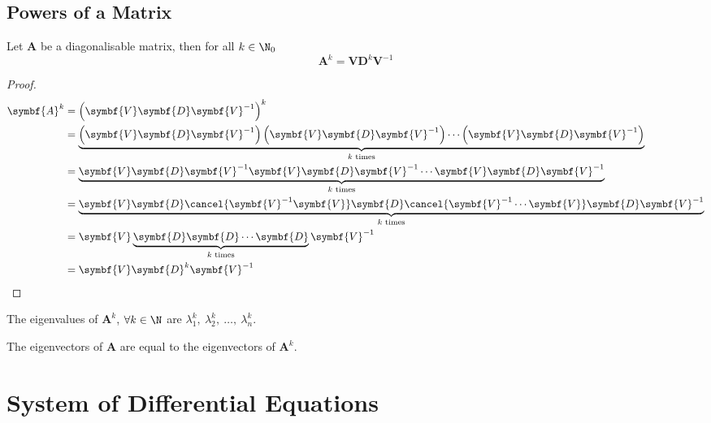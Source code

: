 \documentclass{article}
\begin{document}
\subsection{Powers of a Matrix}
\begin{theorem}
    Let \(\symbf{A}\) be a diagonalisable matrix, then for all
    \(k \in \N_0\)
    \begin{equation*}
        \symbf{A}^k = \symbf{V} \symbf{D}^k \symbf{V}^{-1}
    \end{equation*}
\end{theorem}
\begin{proof}
    \begin{align*}
        \symbf{A}^k & = \left( \symbf{V} \symbf{D} \symbf{V}^{-1} \right)^k                                                                                                                                         \\
                    & = \underbrace{\left( \symbf{V} \symbf{D} \symbf{V}^{-1} \right)\left( \symbf{V} \symbf{D} \symbf{V}^{-1} \right)\cdots\left( \symbf{V} \symbf{D} \symbf{V}^{-1} \right)}_{\text{\(k\) times}} \\
                    & = \underbrace{\symbf{V} \symbf{D} \symbf{V}^{-1} \symbf{V} \symbf{D} \symbf{V}^{-1} \cdots \symbf{V} \symbf{D} \symbf{V}^{-1} }_{\text{\(k\) times}}                                          \\
                    & = \underbrace{\symbf{V} \symbf{D} \cancel{\symbf{V}^{-1} \symbf{V}} \symbf{D} \cancel{\symbf{V}^{-1} \cdots \symbf{V}} \symbf{D} \symbf{V}^{-1} }_{\text{\(k\) times}}                        \\
                    & = \symbf{V} \underbrace{ \symbf{D} \symbf{D} \cdots \symbf{D} }_{\text{\(k\) times}}\symbf{V}^{-1}                                                                                            \\
                    & = \symbf{V} \symbf{D}^k\symbf{V}^{-1}
    \end{align*}
\end{proof}
\begin{theorem}
    The eigenvalues of \(\symbf{A}^k\), \(\forall k \in \N\)
    are \(\lambda_1^k,\: \lambda_2^k,\: \dots,\: \lambda_n^k\).
\end{theorem}
\begin{theorem}
    The eigenvectors of \(\symbf{A}\) are equal to the eigenvectors of
    \(\symbf{A}^k\).
\end{theorem}
\section{System of Differential Equations}
\end{document}
